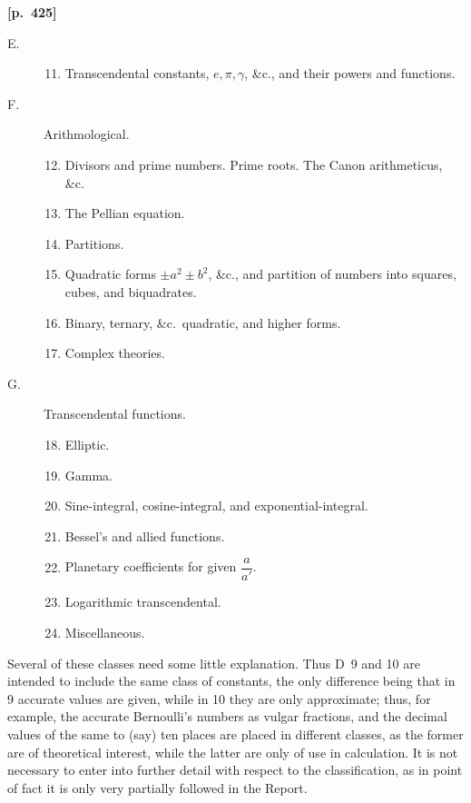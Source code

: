 \documentclass[11pt,a4paper]{article}
\begin{document}
\bigskip
\noindent\textbf{[p.~425]}\quad
\begin{description}
\item[E.] \begin{enumerate}\setcounter{enumi}{10}
\item Transcendental constants, $e,\pi,\gamma$, \&c., and their powers and functions.
\end{enumerate}
\item[F.] Arithmological.
\begin{enumerate}\setcounter{enumi}{11}
\item Divisors and prime numbers. Prime roots. The Canon arithmeticus, \&c.
\item The Pellian equation.
\item Partitions.
\item Quadratic forms $\pm a^{2} \pm b^{2}$, \&c., and partition of numbers into squares, cubes, and biquadrates.
\item Binary, ternary, \&c.\ quadratic, and higher forms.
\item Complex theories.
\end{enumerate}
\item[G.] Transcendental functions.
\begin{enumerate}\setcounter{enumi}{17}
\item Elliptic.
\item Gamma.
\item Sine-integral, cosine-integral, and exponential-integral.
\item Bessel's and allied functions.
\item Planetary coefficients for given $\dfrac{a}{a'}$.
\item Logarithmic transcendental.
\item Miscellaneous.
\end{enumerate}
\end{description}

Several of these classes need some little explanation. Thus D~9 and 10 are intended to include the same class of constants, the only difference being that in 9 accurate values are given, while in 10 they are only approximate; thus, for example, the accurate Bernoulli's numbers as vulgar fractions, and the decimal values of the same to (say) ten places are placed in different classes, as the former are of theoretical interest, while the latter are only of use in calculation. It is not necessary to enter into further detail with respect to the classification, as in point of fact it is only very partially followed in the Report.
\end{document}
